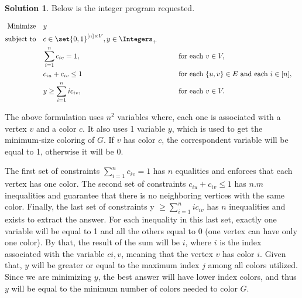 \documentclass[11pt,leqno,final]{amsart}
\theoremstyle{definition}
\newtheorem{solution}{Solution}
\begin{document}

\begin{solution}
Below is the integer program requested.  

\begin{alignat*}{3}
  \text{Minimize} \quad
  & y &
  \\[0pt]
  \text{subject to}\quad
  & c \in \set{0,1}^{[n] \times V}, y \in \Integers_+ &&
  \\[0pt]
  & \sum_{i=1}^{n} c_{iv} = 1, &&
  \qquad \text{for each }v \in V,
  \\[0pt]
  & c_{iu} + c_{iv} \leq 1 &&
  \qquad \text{for each } \{u,v\} \in E \text{ and each } i \in [n],
  \\[0pt]
  & y \geq \sum_{i=1}^{n} i c_{iv}, &&
  \qquad \text{for each }v \in V.
\end{alignat*}

The above formulation uses $n^2$ variables where, each one is associated with a vertex $v$ and a color $c$. It also uses 1 variable $y$, which is used to get the minimum-size coloring of $G$. If $v$ has color $c$, the correspondent variable will be equal to 1, otherwise it will be 0. 

The first set of constraints $\sum_{i=1}^{n} c_{iv} = 1$ has $n$ equalities and enforces that each vertex has one color. The second set of constraints $c_{iu} + c_{iv} \leq 1$ has $n.m$ inequalities and guarantee that there is no neighboring vertices with the same color. Finally, the last set of constraints y $\geq \sum_{i=1}^{n} i c_{iv}$ has $n$ inequalities and exists to extract the answer. For each inequality in this last set, exactly one variable will be equal to 1 and all the others equal to 0 (one vertex can have only one color). By that, the result of the sum will be $i$, where $i$ is the index associated with the variable $c{i,v}$, meaning that the vertex $v$ has color $i$. Given that, $y$ will be greater or equal to the maximum index $j$ among all colors utilized. Since we are minimizing $y$, the best answer will have lower index colors, and thus $y$ will be equal to the minimum number of colors needed to color $G$.

\end{solution}
\end{document}
